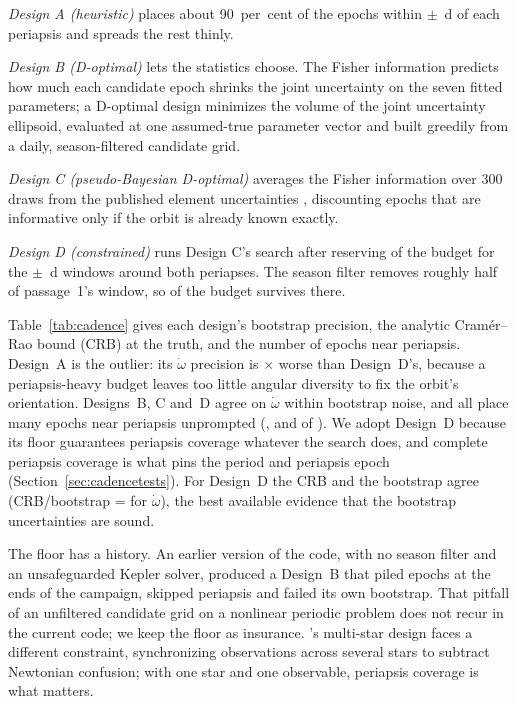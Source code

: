 \documentclass{aastex701}
\begin{document}
\emph{Design A (heuristic)} places about 90~per~cent of the epochs within $\pm$\campaignDenseHalfWidthDays{}~d of each periapsis and spreads the rest thinly.

\emph{Design B (D-optimal)} lets the statistics choose. The Fisher information predicts how much each candidate epoch shrinks the joint uncertainty on the seven fitted parameters; a D-optimal design minimizes the volume of the joint uncertainty ellipsoid, evaluated at one assumed-true parameter vector and built greedily from a daily, season-filtered candidate grid.

\emph{Design C (pseudo-Bayesian D-optimal)} averages the Fisher information over 300 draws from the published element uncertainties \citep{chaloner1995}, discounting epochs that are informative only if the orbit is already known exactly.

\emph{Design D (constrained)} runs Design C's search after reserving \designFloorFractionRequested{} of the budget for the $\pm$\campaignDenseHalfWidthDays{}~d windows around both periapses. The season filter removes roughly half of passage~1's window, so \designFloorFractionRealized{} of the budget survives there.

Table~\ref{tab:cadence} gives each design's bootstrap precision, the analytic Cram\'er--Rao bound (CRB) at the truth, and the number of epochs near periapsis. Design~A is the outlier: its $\dot\omega$ precision is \designBootRatioOmegaDotDOverA{}$\times$ worse than Design~D's, because a periapsis-heavy budget leaves too little angular diversity to fix the orbit's orientation. Designs~B, C and~D agree on $\dot\omega$ within bootstrap noise, and all place many epochs near periapsis unprompted (\designNDenseB{}, \designNDenseC{} and \designNDenseD{} of \campaignNEpochs{}). We adopt Design~D because its floor guarantees periapsis coverage whatever the search does, and complete periapsis coverage is what pins the period and periapsis epoch (Section~\ref{sec:cadencetests}). For Design~D the CRB and the bootstrap agree (CRB/bootstrap = \designCrbOverBootOmegaDotD{} for $\dot\omega$), the best available evidence that the bootstrap uncertainties are sound.

The floor has a history. An earlier version of the code, with no season filter and an unsafeguarded Kepler solver, produced a Design~B that piled epochs at the ends of the campaign, skipped periapsis and failed its own bootstrap. That pitfall of an unfiltered candidate grid on a nonlinear periodic problem does not recur in the current code; we keep the floor as insurance. \citet{piran2026}'s multi-star design faces a different constraint, synchronizing observations across several stars to subtract Newtonian confusion; with one star and one observable, periapsis coverage is what matters.
\end{document}
